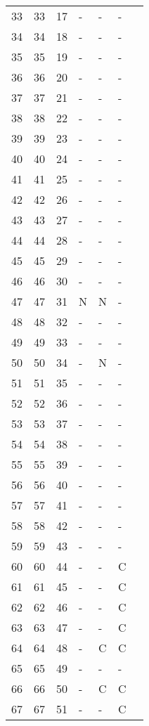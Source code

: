 \begin{longtable}{rrrllll}
  33 &  33 &  17 & - & - & - &  \\ 
  34 &  34 &  18 & - & - & - &  \\ 
  35 &  35 &  19 & - & - & - &  \\ 
  36 &  36 &  20 & - & - & - &  \\ 
  37 &  37 &  21 & - & - & - &  \\ 
  38 &  38 &  22 & - & - & - &  \\ 
  39 &  39 &  23 & - & - & - &  \\ 
  40 &  40 &  24 & - & - & - &  \\ 
  41 &  41 &  25 & - & - & - &  \\ 
  42 &  42 &  26 & - & - & - &  \\ 
  43 &  43 &  27 & - & - & - &  \\ 
  44 &  44 &  28 & - & - & - &  \\ 
  45 &  45 &  29 & - & - & - &  \\ 
  46 &  46 &  30 & - & - & - &  \\ 
  47 &  47 &  31 & N & N & - &  \\ 
  48 &  48 &  32 & - & - & - &  \\ 
  49 &  49 &  33 & - & - & - &  \\ 
  50 &  50 &  34 & - & N & - &  \\ 
  51 &  51 &  35 & - & - & - &  \\ 
  52 &  52 &  36 & - & - & - &  \\ 
  53 &  53 &  37 & - & - & - &  \\ 
  54 &  54 &  38 & - & - & - &  \\ 
  55 &  55 &  39 & - & - & - &  \\ 
  56 &  56 &  40 & - & - & - &  \\ 
  57 &  57 &  41 & - & - & - &  \\ 
  58 &  58 &  42 & - & - & - &  \\ 
  59 &  59 &  43 & - & - & - &  \\ 
  60 &  60 &  44 & - & - & C &  \\ 
  61 &  61 &  45 & - & - & C &  \\ 
  62 &  62 &  46 & - & - & C &  \\ 
  63 &  63 &  47 & - & - & C &  \\ 
  64 &  64 &  48 & - & C & C &  \\ 
  65 &  65 &  49 & - & - & - &  \\ 
  66 &  66 &  50 & - & C & C &  \\ 
  67 &  67 &  51 & - & - & C &  \\ 

\end{longtable}

